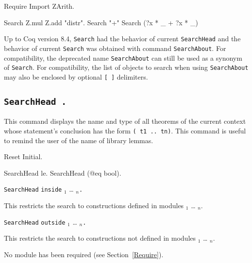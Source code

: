 \examples

\begin{coq_example*}
Require Import ZArith.
\end{coq_example*}
\begin{coq_example}
Search Z.mul Z.add "distr".
Search "+"%
Search (?x * _ + ?x * _)%
\end{coq_example}

\Warning {} Up to Coq version 8.4, {\tt Search}
had the behavior of current {\tt SearchHead} and the behavior of
current {\tt Search} was obtained with command {\tt SearchAbout}. For
compatibility, the deprecated name {\tt SearchAbout} can still be used
as a synonym of {\tt Search}. For compatibility, the list of objects to
search when using {\tt SearchAbout} may also be enclosed by optional
{\tt [ ]} delimiters.

\subsection[\tt SearchHead {\term}.]{\tt SearchHead {\term}.}
This command displays the name and type of all theorems of the current
context whose statement's conclusion has the form {\tt ({\term} t1 ..
  tn)}.  This command is useful to remind the user of the name of
library lemmas.

\begin{coq_example*}
Reset Initial.
\end{coq_example*}

\begin{coq_example}
SearchHead le.
SearchHead (@eq bool).
\end{coq_example}

\begin{Variants}
\item
{\tt SearchHead} {\term} {\tt inside} {\module$_1$} \ldots{} {\module$_n$}{\tt .}

This restricts the search to constructions defined in modules
{\module$_1$} \ldots{} {\module$_n$}.

\item {\tt SearchHead} {\term} {\tt outside} {\module$_1$} \ldots{} {\module$_n$}{\tt .}

This restricts the search to constructions not defined in modules
{\module$_1$} \ldots{} {\module$_n$}.

\begin{ErrMsgs}
\item {}
No module \module{} has been required (see Section~\ref{Require}).
\end{ErrMsgs}

\end{Variants}

